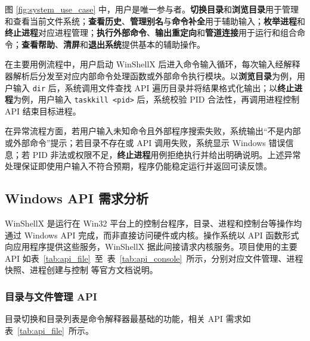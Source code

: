 \documentclass[UTF8,a4paper,12pt,fontset=none]{ctexart}
\newcommand{\tabrefpage}[1]{\mbox{如表~\ref{#1}~所示}}
\begin{document}
图 \ref{fig:system_use_case} 中，用户是唯一参与者。\textbf{切换目录}和\textbf{浏览目录}用于管理和查看当前文件系统；\textbf{查看历史}、\textbf{管理别名}与\textbf{命令补全}用于辅助输入；\textbf{枚举进程}和\textbf{终止进程}对应进程管理；\textbf{执行外部命令}、\textbf{输出重定向}和\textbf{管道连接}用于运行和组合命令；\textbf{查看帮助}、\textbf{清屏}和\textbf{退出系统}提供基本的辅助操作。

在主要用例流程中，用户启动 WinShellX 后进入命令输入循环，每次输入经解释器解析后分发至对应内部命令处理函数或外部命令执行模块。以\textbf{浏览目录}为例，用户输入 \texttt{dir} 后，系统调用文件查找 API 遍历目录并将结果格式化输出；以\textbf{终止进程}为例，用户输入 \texttt{taskkill <pid>} 后，系统校验 PID 合法性，再调用进程控制 API 结束目标进程。

在异常流程方面，若用户输入未知命令且外部程序搜索失败，系统输出“不是内部或外部命令”提示；若目录不存在或 API 调用失败，系统显示 Windows 错误信息；若 PID 非法或权限不足，\textbf{终止进程}用例拒绝执行并给出明确说明。上述异常处理保证即使用户输入不符合预期，程序仍能稳定运行并返回可读反馈。

\subsection{Windows API 需求分析}

WinShellX 是运行在 Win32 平台上的控制台程序，目录、进程和控制台等操作均通过 Windows API 完成，而非直接访问硬件或内核\cite{ms-win32-api}。操作系统以 API 函数形式向应用程序提供这些服务，WinShellX 据此间接请求内核服务。项目使用的主要 API \mbox{如表~\ref{tab:api_file}~至~表~\ref{tab:api_console}~所示}，分别对应文件管理\cite{ms-file}、进程快照\cite{ms-toolhelp}、进程创建与控制\cite{ms-process} 等官方文档说明。

\subsubsection{目录与文件管理 API}

目录切换和目录列表是命令解释器最基础的功能，相关 API 需求\tabrefpage{tab:api_file}。
\end{document}
